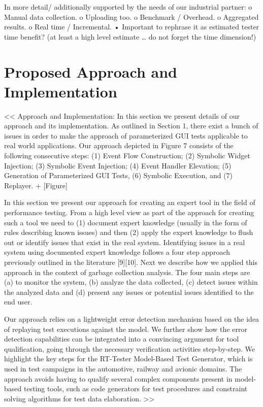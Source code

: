 \documentclass[runningheads,a4paper]{llncs}
\begin{document}
In more detail/ additionally supported by the needs of our industrial partner:
o	Manual data collection.
o	Uploading too.
o	Benchmark / Overhead.
o	Aggregated results.
o	Real time / Incremental.
•	Important to rephrase it as estimated tester time benefit? (at least a high level estimate … do not forget the time dimension!)



\section{Proposed Approach and Implementation}

<<
Approach and Implementation: In this section we present details of our approach and its 
implementation. As outlined in Section 1, there exist a bunch of issues in order to make the 
approach of parameterized GUI tests applicable to real world applications. Our
approach depicted in Figure 7 consists of the following consecutive steps: (1)
Event Flow Construction; (2) Symbolic Widget Injection; (3) Symbolic Event
Injection; (4) Event Handler Elevation; (5) Generation of Parameterized GUI
Tests, (6) Symbolic Execution, and (7) Replayer. + [Figure]

In this section we present our approach for creating an expert tool in the
field of performance testing. From a high level view as part of the approach for 
creating such a tool we need to (1) document expert knowledge (usually in the form 
of rules describing known issues) and then (2) apply the expert knowledge to flush out 
or identify issues that exist in the real system. Identifying issues in a real system 
using documented expert knowledge follows a four step approach previously outlined in 
the literature [9][10]. Next we describe how we applied this approach in the context of 
garbage collection analysis. The four main steps are (a) to monitor the system, (b) 
analyze the data collected, (c) detect issues within the analyzed data and (d) present 
any issues or potential issues identified to the end user.

Our approach relies on a lightweight error detection mechanism based on the idea 
of replaying test executions against the model. We further show how the
error detection capabilities can be integrated into a convincing argument
for tool qualification, going through the necessary verification activities
step-by-step. We highlight the key steps for the RT-Tester Model-Based
Test Generator, which is used in test campaigns in the automotive, railway
and avionic domains. The approach avoids having to qualify several
complex components present in model-based testing tools, such as code
generators for test procedures and constraint solving algorithms for test
data elaboration.
>>
\end{document}
